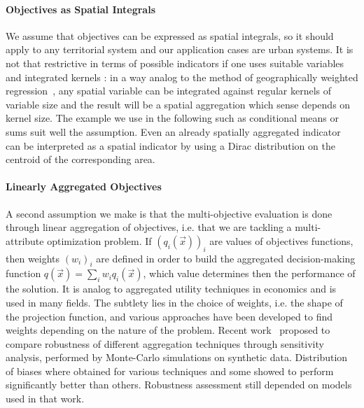 \documentclass[runningheads,a4paper]{llncs2e/llncs}
\begin{document}
\paragraph{Objectives as Spatial Integrals}

We assume that objectives can be expressed as spatial integrals, so it should apply to any territorial system and our application cases are urban systems. It is not that restrictive in terms of possible indicators if one uses suitable variables and integrated kernels : in a way analog to the method of geographically weighted regression~\cite{brunsdon1998geographically}, any spatial variable can be integrated against regular kernels of variable size and the result will be a spatial aggregation which sense depends on kernel size. The example we use in the following such as conditional means or sums suit well the assumption. Even an already spatially aggregated indicator can be interpreted as a spatial indicator by using a Dirac distribution on the centroid of the corresponding area.


\paragraph{Linearly Aggregated Objectives}

A second assumption we make is that the multi-objective evaluation is done through linear aggregation of objectives, i.e. that we are tackling a multi-attribute optimization problem. If $(q_i(\vec{x}))_i$ are values of objectives functions, then weights $(w_i)_i$ are defined in order to build the aggregated decision-making function $q(\vec{x})=\sum_i{w_i q_i(\vec{x})}$, which value determines then the performance of the solution. It is analog to aggregated utility techniques in economics and is used in many fields.
The subtlety lies in the choice of weights, i.e. the shape of the projection function, and various approaches have been developed to find weights depending on the nature of the problem. Recent work~\cite{dobbie2013robustness} proposed to compare robustness of different aggregation techniques through sensitivity analysis, performed by Monte-Carlo simulations on synthetic data. Distribution of biases where obtained for various techniques and some showed to perform significantly better than others. Robustness assessment still depended on models used in that work.
\end{document}

